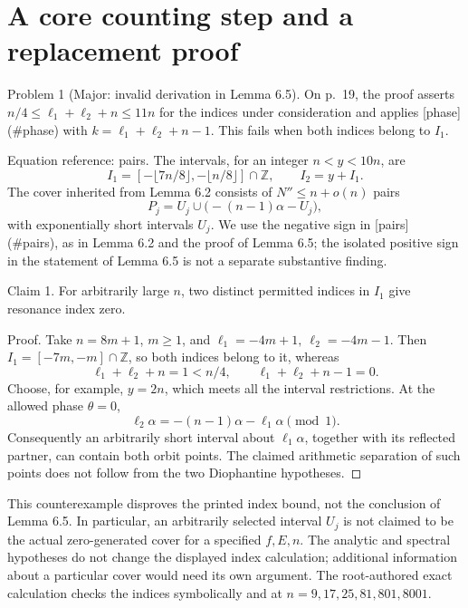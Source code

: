 \documentclass[10pt]{article}
\begin{document}
\section*{A core counting step and a replacement proof}
Problem 1 (Major: invalid derivation in Lemma 6.5).  On p. 19, the proof asserts \(n/4\le \ell_1+\ell_2+n\le11n\) for the indices under consideration and applies [phase] (\#phase) with \(k=\ell_1+\ell_2+n-1\). This fails when both indices belong to \(I_1\).\par
Equation reference: pairs. The intervals, for an integer \(n<y<10n\), are \[I_1=[-\lfloor7n/8\rfloor,-\lfloor n/8\rfloor]\cap\mathbb Z,
 \qquad I_2=y+I_1 .\] The cover inherited from Lemma 6.2 consists of \(N''\le n+o(n)\) pairs \[
 P_j=U_j\cup\bigl(-(n-1)\alpha-U_j\bigr),\] with exponentially short intervals \(U_j\). We use the negative sign in [pairs] (\#pairs), as in Lemma 6.2 and the proof of Lemma 6.5; the isolated positive sign in the statement of Lemma 6.5 is not a separate substantive finding.\par
Claim 1.  For arbitrarily large \(n\), two distinct permitted indices in \(I_1\) give resonance index zero.\par
Proof. Take \(n=8m+1\), \(m\ge1\), and \(\ell_1=-4m+1,\ \ell_2=-4m-1\). Then \(I_1=[-7m,-m]\cap\mathbb Z\), so both indices belong to it, whereas \[\ell_1+\ell_2+n=1<n/4,\qquad
 \ell_1+\ell_2+n-1=0 .\] Choose, for example, \(y=2n\), which meets all the interval restrictions. At the allowed phase \(\theta=0\), \[\ell_2\alpha=-(n-1)\alpha-\ell_1\alpha\pmod1.\] Consequently an arbitrarily short interval about \(\ell_1\alpha\), together with its reflected partner, can contain both orbit points. The claimed arithmetic separation of such points does not follow from the two Diophantine hypotheses. ◻\par
This counterexample disproves the printed index bound, not the conclusion of Lemma 6.5. In particular, an arbitrarily selected interval \(U_j\) is not claimed to be the actual zero-generated cover for a specified \(f,E,n\). The analytic and spectral hypotheses do not change the displayed index calculation; additional information about a particular cover would need its own argument. The root-authored exact calculation checks the indices symbolically and at \(n=9,17,25,81,801,8001\).\par
\end{document}
